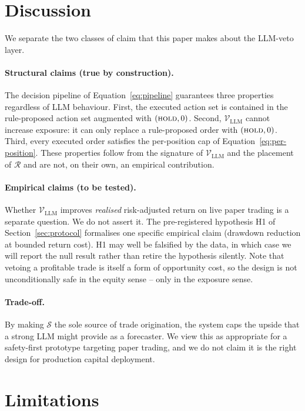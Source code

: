 \documentclass{article}
\begin{document}
\section{Discussion}
We separate the two classes of claim that this paper makes about the LLM-veto layer.

\paragraph{Structural claims (true by construction).} The decision pipeline of Equation~\eqref{eq:pipeline} guarantees three properties regardless of LLM behaviour. First, the executed action set is contained in the rule-proposed action set augmented with $(\textsc{hold}, 0)$. Second, $\mathcal{V}_{\text{LLM}}$ cannot increase exposure: it can only replace a rule-proposed order with $(\textsc{hold}, 0)$. Third, every executed order satisfies the per-position cap of Equation~\eqref{eq:per-position}. These properties follow from the signature of $\mathcal{V}_{\text{LLM}}$ and the placement of $\mathcal{R}$ and are not, on their own, an empirical contribution.

\paragraph{Empirical claims (to be tested).} Whether $\mathcal{V}_{\text{LLM}}$ improves \emph{realised} risk-adjusted return on live paper trading is a separate question. We do not assert it. The pre-registered hypothesis H1 of Section~\ref{sec:protocol} formalises one specific empirical claim (drawdown reduction at bounded return cost). H1 may well be falsified by the data, in which case we will report the null result rather than retire the hypothesis silently. Note that vetoing a profitable trade is itself a form of opportunity cost, so the design is not unconditionally safe in the equity sense -- only in the exposure sense.

\paragraph{Trade-off.} By making $\mathcal{S}$ the sole source of trade origination, the system caps the upside that a strong LLM might provide as a forecaster. We view this as appropriate for a safety-first prototype targeting paper trading, and we do not claim it is the right design for production capital deployment.

\section{Limitations}
\label{sec:limitations}
\end{document}
